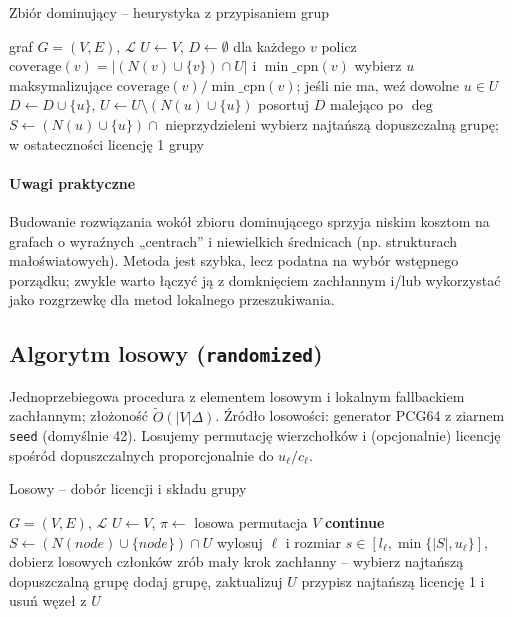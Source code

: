 \begin{algorithm}[H]
\caption{Zbiór dominujący – heurystyka z przypisaniem grup}
\label{alg:ds}
\begin{algorithmic}[1]
\Require graf $G=(V,E)$, $\mathcal{L}$
\State $U\gets V$, $D\gets\emptyset$
  \State dla każdego $v$ policz $\mathrm{coverage}(v)=|(N(v)\cup\{v\})\cap U|$ i $\min\_\mathrm{cpn}(v)$
  \State wybierz $u$ maksymalizujące $\mathrm{coverage}(v)/\min\_\mathrm{cpn}(v)$; jeśli nie ma, weź dowolne $u\in U$
  \State $D\gets D\cup\{u\}$, $U\gets U\setminus(N(u)\cup\{u\})$
\EndWhile
\State posortuj $D$ malejąco po $\deg$
  \State $S\gets(N(u)\cup\{u\})\cap$ nieprzydzieleni
  \State wybierz najtańszą dopuszczalną grupę; w ostateczności licencję 1
\EndFor
\State \Return grupy
\end{algorithmic}
\end{algorithm}

\paragraph{Uwagi praktyczne}
Budowanie rozwiązania wokół zbioru dominującego sprzyja niskim kosztom na grafach o wyraźnych „centrach” i niewielkich średnicach (np. strukturach małoświatowych). Metoda jest szybka, lecz podatna na wybór wstępnego porządku; zwykle warto łączyć ją z domknięciem zachłannym i/lub wykorzystać jako rozgrzewkę dla metod lokalnego przeszukiwania.

\subsection{Algorytm losowy (\texttt{randomized})}\label{subsec:random}

Jednoprzebiegowa procedura z elementem losowym i lokalnym fallbackiem zachłannym; złożoność $\tilde O(|V|\Delta)$. Źródło losowości: generator PCG64 z ziarnem \texttt{seed} (domyślnie 42). Losujemy permutację wierzchołków i (opcjonalnie) licencję spośród dopuszczalnych proporcjonalnie do $u_\ell/c_\ell$.

\begin{algorithm}[H]
\caption{Losowy – dobór licencji i składu grupy}
\label{alg:randomized}
\begin{algorithmic}[1]
\Require $G=(V,E)$, $\mathcal{L}$
\State $U\gets V$, $\pi\gets$ losowa permutacja $V$
   \textbf{continue}\EndIf
  \State $S\gets(N(node)\cup\{node\})\cap U$
    \State wylosuj $\ell$ i rozmiar $s\in[l_\ell,\min\{|S|,u_\ell\}]$, dobierz losowych członków
  \Else
    \State zrób mały krok zachłanny – wybierz najtańszą dopuszczalną grupę
  \EndIf
  \State dodaj grupę, zaktualizuj $U$
\EndFor
{} przypisz najtańszą licencję 1 i usuń węzeł z $U$ \EndWhile
\end{algorithmic}
\end{algorithm}

